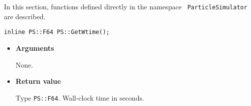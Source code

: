 
In this section, functions defined directly in the namespace {\tt
ParticleSimulator} are described.



\begin{screen}
\begin{verbatim}
inline PS::F64 PS::GetWtime();
\end{verbatim}
\end{screen}

\begin{itemize}





\item{{\bf Arguments}}

None.

\item{{\bf Return value}}

Type {\tt PS::F64}.  Wall-clock time in seconds. 

\end{itemize}


